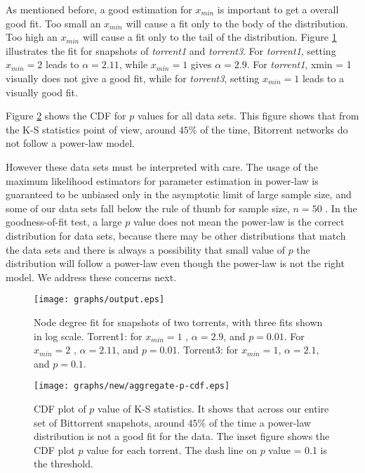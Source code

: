 \documentclass[paper]{ieice}
\begin{document}
As mentioned before, a good estimation for $x_{min}$ is important to get a overall good fit.
Too small an $x_{min}$ will cause a fit only to the body of the distribution.
Too high an $x_{min}$ will cause a fit only to the tail of the distribution.
Figure  \ref{fig:fitting} illustrates the fit for snapshots of \emph{torrent1} and \emph{torrent3}.
For \emph{torrent1}, setting $x_{min}=2$  leads to  $\alpha=2.11$, while $x_{min}=1$ gives $\alpha=2.9$.
For \emph{torrent1}, xmin = 1 visually does not give a good fit, while for  \emph{torrent3}, setting $x_{min}=1$ leads to a visually good fit.

Figure  \ref{fig:cdf-p} shows the CDF for $p$ values for all data sets. 
This figure shows that from the K-S statistics point of view, around $45\%$ of the time, Bitorrent networks do not follow a power-law model.

However these data sets must be interpreted with care. 
The usage of the maximum likelihood estimators for parameter estimation in power-law is guaranteed to be unbiased only in the asymptotic limit of large sample size, and some of our data sets fall below the rule of thumb for sample size, $n=50$ \cite{clauset2009power}. 
In the goodness-of-fit test, a large $p$ value does not mean the power-law  is the correct distribution for data sets, because there may be other distributions that match the data sets and there is always a possibility that small value of $p$ the distribution will follow a power-law even though the power-law is not the right model\cite{clauset2009power}. 
We address these concerns next.

\begin{figure}[tb]
\begin{center}
\texttt{[image: graphs/output.eps]}
\end{center}
\caption{Node degree fit for snapshots of two torrents, with three fits shown in log scale. Torrent1: for $x_{min}=1$ , $\alpha = 2.9$, and $p=0.01$. For $x_{min}=2$ , $\alpha = 2.11$, and $p = 0.01$. Torrent3: for $x_{min}=1$, $\alpha = 2.1$, and $p = 0.1$. }
\label{fig:fitting}
\end{figure}

\begin{figure}[tb]
\begin{center}
\texttt{[image: graphs/new/aggregate-p-cdf.eps]}
\end{center}
\caption{CDF plot of $p$ value of K-S statistics. It shows that across our entire set of Bittorrent snapshots, around $45\%$ of the time a power-law distribution is not a good fit for the data. 
The inset figure shows the CDF plot $p$ value for each torrent. The dash line on $p$ value = 0.1 is the threshold.} 
\label{fig:cdf-p}
\end{figure}
\end{document}
